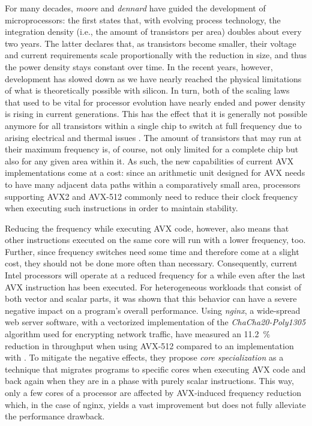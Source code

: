 {For many decades, \emph{\gls{moore}} \cite{moore1975progress} and \emph{\gls{dennard}} \cite{dennard1974design} have guided the development of microprocessors: the first states that, with evolving process technology, the integration density (i.e., the amount of transistors per area) doubles about every two years. The latter declares that, as transistors become smaller, their voltage and current requirements scale proportionally with the reduction in size, and thus the power density stays constant over time. In the recent years, however, development has slowed down as we have nearly reached the physical limitations of what is theoretically possible with silicon. In turn, both of the scaling laws that used to be vital for processor evolution have nearly ended and power density is rising in current generations. This has the effect that it is generally not possible anymore for all transistors within a single chip to switch at full frequency due to arising electrical and thermal issues \cite{taylor2012dark}. The amount of transistors that may run at their maximum frequency is, of course, not only limited for a complete chip but also for any given area within it. As such, the new capabilities of current \gls{AVX} implementations come at a cost: since an arithmetic unit designed for \gls{AVX} needs to have many adjacent data paths within a comparatively small area, processors supporting \gls{AVX2} and \gls{AVX-512} commonly need to reduce their clock frequency when executing such instructions in order to maintain stability.

Reducing the frequency while executing \gls{AVX} code, however, also means that other instructions executed on the same core will run with a lower frequency, too. Further, since frequency switches need some time and therefore come at a slight cost, they should not be done more often than necessary. Consequently, current Intel processors will operate at a reduced frequency for a while even after the last \gls{AVX} instruction has been executed. For heterogeneous workloads that consist of both vector and scalar parts, it was shown that this behavior can have a severe negative impact on a program's overall performance. Using \emph{nginx}, a wide-spread web server software, with a vectorized implementation of the \textit{ChaCha20-Poly1305} algorithm used for encrypting network traffic, \citeauthor{gottschlag19sfma} \cite{gottschlag19sfma} have measured an \SI{11.2}{\percent} reduction in throughput when using \gls{AVX-512} compared to an implementation with . To mitigate the negative effects, they propose \emph{core specialization} as a technique that migrates programs to specific cores when executing \gls{AVX} code and back again when they are in a phase with purely scalar instructions. This way, only a few cores of a processor are affected by \gls{AVX}-induced frequency reduction which, in the case of nginx, yields a vast improvement but does not fully alleviate the performance drawback.

}
